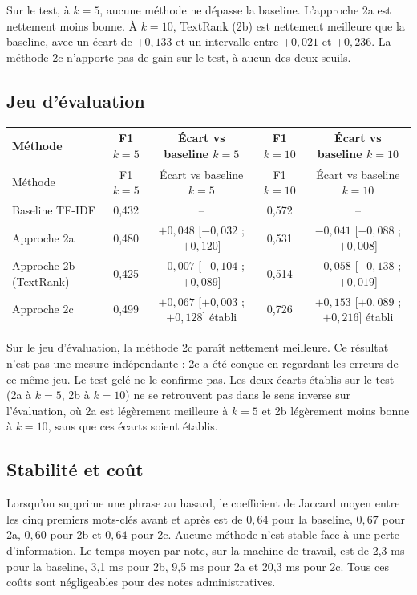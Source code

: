 \documentclass[11pt,a4paper]{article}
\begin{document}
Sur le test, à $k=5$, aucune méthode ne dépasse la baseline. L'approche 2a est nettement moins bonne. À $k=10$, TextRank (2b) est nettement meilleure que la baseline, avec un écart de $+0,133$ et un intervalle entre $+0,021$ et $+0,236$. La méthode 2c n'apporte pas de gain sur le test, à aucun des deux seuils.

\subsection{Jeu d'évaluation}

{\small\begin{longtable}{lcccc}
\toprule
Méthode & F1 $k=5$ & Écart vs baseline $k=5$ & F1 $k=10$ & Écart vs baseline $k=10$ \\
\midrule
\endfirsthead
\toprule
Méthode & F1 $k=5$ & Écart vs baseline $k=5$ & F1 $k=10$ & Écart vs baseline $k=10$ \\
\midrule
\endhead
Baseline TF-IDF & 0,432 & -- & 0,572 & -- \\
Approche 2a & 0,480 & $+0,048$ [$-0,032$ ; $+0,120$] & 0,531 & $-0,041$ [$-0,088$ ; $+0,008$] \\
Approche 2b (TextRank) & 0,425 & $-0,007$ [$-0,104$ ; $+0,089$] & 0,514 & $-0,058$ [$-0,138$ ; $+0,019$] \\
Approche 2c & 0,499 & $+0,067$ [$+0,003$ ; $+0,128$] établi & 0,726 & $+0,153$ [$+0,089$ ; $+0,216$] établi \\
\bottomrule
\end{longtable}}

Sur le jeu d'évaluation, la méthode 2c paraît nettement meilleure. Ce résultat n'est pas une mesure indépendante : 2c a été conçue en regardant les erreurs de ce même jeu. Le test gelé ne le confirme pas. Les deux écarts établis sur le test (2a à $k=5$, 2b à $k=10$) ne se retrouvent pas dans le sens inverse sur l'évaluation, où 2a est légèrement meilleure à $k=5$ et 2b légèrement moins bonne à $k=10$, sans que ces écarts soient établis.

\subsection{Stabilité et coût}

Lorsqu'on supprime une phrase au hasard, le coefficient de Jaccard moyen entre les cinq premiers mots-clés avant et après est de $0,64$ pour la baseline, $0,67$ pour 2a, $0,60$ pour 2b et $0,64$ pour 2c. Aucune méthode n'est stable face à une perte d'information. Le temps moyen par note, sur la machine de travail, est de 2,3 ms pour la baseline, 3,1 ms pour 2b, 9,5 ms pour 2a et 20,3 ms pour 2c. Tous ces coûts sont négligeables pour des notes administratives.
\end{document}
